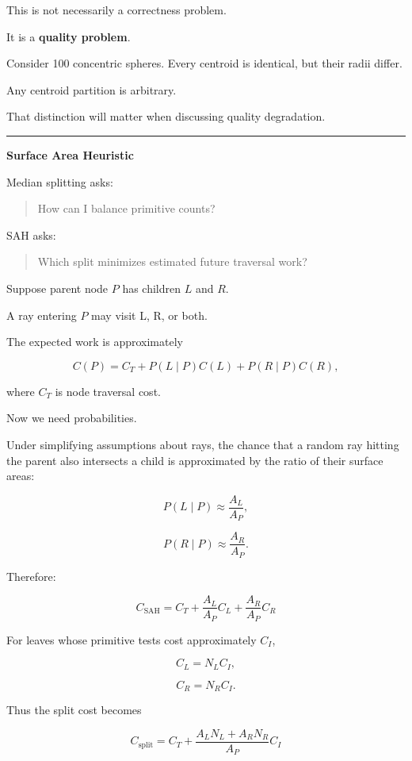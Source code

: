 This is not necessarily a correctness problem.

It is a \textbf{quality problem}.

Consider 100 concentric spheres. Every centroid is identical, but their radii differ.

Any centroid partition is arbitrary.

That distinction will matter when discussing quality degradation.

\begin{center}\rule{0.5\linewidth}{0.5pt}\end{center}

\textbf{Surface Area Heuristic}

Median splitting asks:

\begin{quote}
How can I balance primitive counts?
\end{quote}

SAH asks:

\begin{quote}
Which split minimizes estimated future traversal work?
\end{quote}

Suppose parent node \(P\) has children \(L\) and \(R\).

A ray entering \(P\) may visit L, R, or both.

The expected work is approximately

\[
C(P)=
C_T
+
P(L\mid P)C(L)
+
P(R\mid P)C(R),
\]

where \(C_T\) is node traversal cost.

Now we need probabilities.

Under simplifying assumptions about rays, the chance that a random ray hitting the parent also intersects a child is approximated by the ratio of their surface areas:

\[
P(L\mid P)
\approx
\frac{A_L}{A_P},
\]

\[
P(R\mid P)
\approx
\frac{A_R}{A_P}.
\]

Therefore:

\[
\boxed{
C_{\text{SAH}}
=
C_T+
\frac{A_L}{A_P}C_L+
\frac{A_R}{A_P}C_R
}
\]

For leaves whose primitive tests cost approximately \(C_I\),

\[
C_L=N_LC_I,
\]

\[
C_R=N_RC_I.
\]

Thus the split cost becomes

\[
\boxed{
C_{\text{split}}
=
C_T+
\frac{
A_LN_L+A_RN_R
}{
A_P
}
C_I
}
\]

